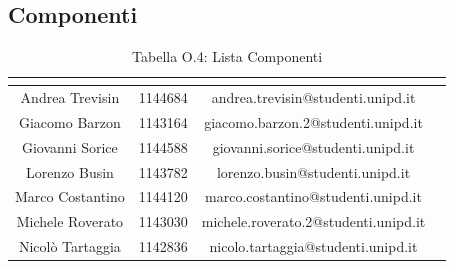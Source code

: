 \subsection{Componenti}
\renewcommand{\arraystretch}{2}
\begin{table}[H]
\begin{center}
  \begin{tabular}{| c | c | c | p{3cm} |}
    \hline
    \rowcolor{title_row}
    \textbf{\color{title_text}{Nominativo}} & \textbf{\color{title_text}{Matricola}} & \textbf{\color{title_text}{Email}} \\ \hline
    Andrea Trevisin & 1144684 & andrea.trevisin@studenti.unipd.it \\ \hline
    Giacomo Barzon & 1143164 & giacomo.barzon.2@studenti.unipd.it \\ \hline
    Giovanni Sorice & 1144588 & giovanni.sorice@studenti.unipd.it \\ \hline
    Lorenzo Busin & 1143782 & lorenzo.busin@studenti.unipd.it \\ \hline
    Marco Costantino & 1144120 & marco.costantino@studenti.unipd.it \\ \hline
    Michele Roverato & 1143030 & michele.roverato.2@studenti.unipd.it \\ \hline
    Nicolò Tartaggia & 1142836 & nicolo.tartaggia@studenti.unipd.it \\ 
    \hline
  \end{tabular}
  \caption{Tabella O.4: Lista Componenti\label{}}
\end{center}
\end{table}
\renewcommand{\arraystretch}{1}
\pagebreak